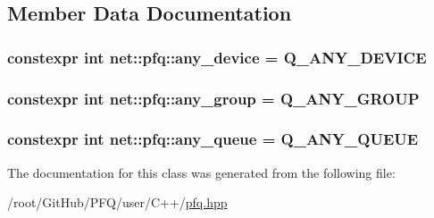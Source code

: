 \subsection{Member Data Documentation}
\hypertarget{classnet_1_1pfq_a8ecbb4cb4e632b85865a6c77fd4a6a45}{
\subsubsection[{any\-\_\-device}]{\setlength{\rightskip}{0pt plus 5cm}constexpr int net\-::pfq\-::any\-\_\-device = Q\-\_\-\-A\-N\-Y\-\_\-\-D\-E\-V\-I\-C\-E\hspace{0.3cm}{\ttfamily [static]}}}\label{classnet_1_1pfq_a8ecbb4cb4e632b85865a6c77fd4a6a45}
\hypertarget{classnet_1_1pfq_a3aa94e5b77640a4db592893fa9220e81}{
\subsubsection[{any\-\_\-group}]{\setlength{\rightskip}{0pt plus 5cm}constexpr int net\-::pfq\-::any\-\_\-group = Q\-\_\-\-A\-N\-Y\-\_\-\-G\-R\-O\-U\-P\hspace{0.3cm}{\ttfamily [static]}}}\label{classnet_1_1pfq_a3aa94e5b77640a4db592893fa9220e81}
\hypertarget{classnet_1_1pfq_a0d4eca6d0925b7c49365675c9cf9385c}{
\subsubsection[{any\-\_\-queue}]{\setlength{\rightskip}{0pt plus 5cm}constexpr int net\-::pfq\-::any\-\_\-queue = Q\-\_\-\-A\-N\-Y\-\_\-\-Q\-U\-E\-U\-E\hspace{0.3cm}{\ttfamily [static]}}}\label{classnet_1_1pfq_a0d4eca6d0925b7c49365675c9cf9385c}


The documentation for this class was generated from the following file\-:\begin{DoxyCompactItemize}
\item 
/root/\-Git\-Hub/\-P\-F\-Q/user/\-C++/\hyperlink{pfq_8hpp}{pfq.\-hpp}\end{DoxyCompactItemize}
